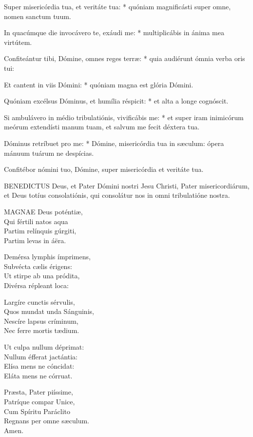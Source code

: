 Super misericórdia tua, et veritáte tua: * quóniam magnificásti super omne, nomen sanctum tuum.

In quacúmque die invocávero te, exáudi me: * multiplicábis in ánima mea virtútem.

Confiteántur tibi, Dómine, omnes reges terræ: * quia audiérunt ómnia verba oris tui:

Et cantent in viis Dómini: * quóniam magna est glória Dómini.

Quóniam excélsus Dóminus, et humília réspicit: * et alta a longe cognóscit.

Si ambulávero in médio tribulatiónis, vivificábis me: * et super iram inimicórum meórum extendísti manum tuam, et salvum me fecit déxtera tua.

Dóminus retríbuet pro me: * Dómine, misericórdia tua in sæculum: ópera mánuum tuárum ne despícias.

 Confitébor nómini tuo, Dómine, super misericórdia et veritáte tua.



\lettrine[lines=2]{B}{ENEDICTUS} Deus, et Pater Dómini nostri Jesu Christi, Pater misericordiárum, et Deus totíus consolatiónis, qui consolátur nos in omni tribulatióne nostra.


\lettrine[lines=2]{M}{AGNAE} Deus poténtiæ,\\
Qui fértili natos aqua\\
Partim relínquis gúrgiti,\\
Partim levas in áëra.

Demérsa lymphis ímprimens,\\
Subvécta cælis érigens:\\
Ut stirpe ab una pródita,\\
Divérsa répleant loca:

Largíre cunctis sérvulis,\\
Quos mundat unda Sánguinis,\\
Nescíre lapsus críminum,\\
Nec ferre mortis tædium.

Ut culpa nullum déprimat:\\
Nullum éfferat jactántia:\\
Elísa mens ne cóncidat:\\
Eláta mens ne córruat.

Præsta, Pater piíssime,\\
Patríque compar Unice,\\
Cum Spíritu Paráclito\\
Regnans per omne sæculum.\\
Amen.

